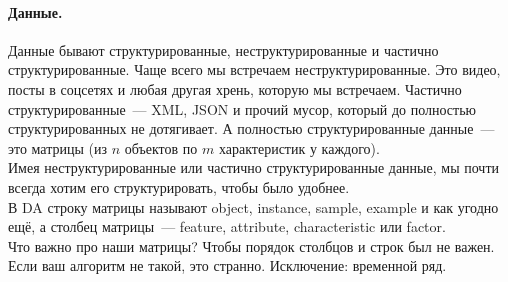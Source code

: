 \documentclass{article}
\begin{document}
    \paragraph{Данные.}
    Данные бывают структурированные, неструктурированные и частично структурированные. Чаще всего мы встречаем неструктурированные. Это видео, посты в соцсетях и любая другая хрень, которую мы встречаем. Частично структурированные~--- XML, JSON и прочий мусор, который до полностью структурированных не дотягивает. А полностью структурированные данные~--- это матрицы (из $n$ объектов по $m$ характеристик у каждого).\\
    Имея неструктурированные или частично структурированные данные, мы почти всегда хотим его структурировать, чтобы было удобнее.\\
    В DA строку матрицы называют object, instance, sample, example и как угодно ещё, а столбец матрицы~--- feature, attribute, characteristic или factor.\\
    Что важно про наши матрицы? Чтобы порядок столбцов и строк был не важен. Если ваш алгоритм не такой, это странно. Исключение: временной ряд.
\end{document}
